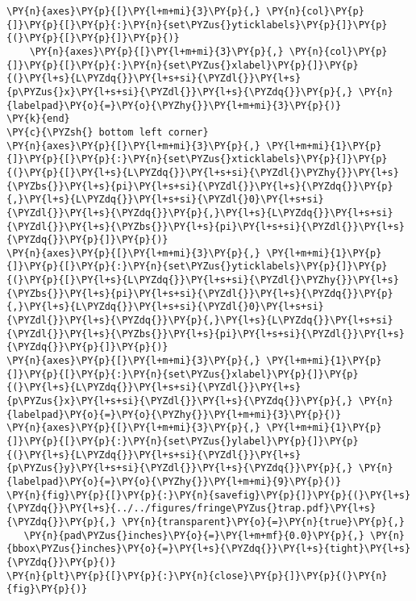 \begin{Verbatim}[commandchars=\\\{\}]
    \PY{n}{axes}\PY{p}{[}\PY{l+m+mi}{3}\PY{p}{,} \PY{n}{col}\PY{p}{]}\PY{p}{[}\PY{p}{:}\PY{n}{set\PYZus{}yticklabels}\PY{p}{]}\PY{p}{(}\PY{p}{[}\PY{p}{]}\PY{p}{)}
    \PY{n}{axes}\PY{p}{[}\PY{l+m+mi}{3}\PY{p}{,} \PY{n}{col}\PY{p}{]}\PY{p}{[}\PY{p}{:}\PY{n}{set\PYZus{}xlabel}\PY{p}{]}\PY{p}{(}\PY{l+s}{L\PYZdq{}}\PY{l+s+si}{\PYZdl{}}\PY{l+s}{p\PYZus{}x}\PY{l+s+si}{\PYZdl{}}\PY{l+s}{\PYZdq{}}\PY{p}{,} \PY{n}{labelpad}\PY{o}{=}\PY{o}{\PYZhy{}}\PY{l+m+mi}{3}\PY{p}{)}
\PY{k}{end}
\PY{c}{\PYZsh{} bottom left corner}
\PY{n}{axes}\PY{p}{[}\PY{l+m+mi}{3}\PY{p}{,} \PY{l+m+mi}{1}\PY{p}{]}\PY{p}{[}\PY{p}{:}\PY{n}{set\PYZus{}xticklabels}\PY{p}{]}\PY{p}{(}\PY{p}{[}\PY{l+s}{L\PYZdq{}}\PY{l+s+si}{\PYZdl{}\PYZhy{}}\PY{l+s}{\PYZbs{}}\PY{l+s}{pi}\PY{l+s+si}{\PYZdl{}}\PY{l+s}{\PYZdq{}}\PY{p}{,}\PY{l+s}{L\PYZdq{}}\PY{l+s+si}{\PYZdl{}0}\PY{l+s+si}{\PYZdl{}}\PY{l+s}{\PYZdq{}}\PY{p}{,}\PY{l+s}{L\PYZdq{}}\PY{l+s+si}{\PYZdl{}}\PY{l+s}{\PYZbs{}}\PY{l+s}{pi}\PY{l+s+si}{\PYZdl{}}\PY{l+s}{\PYZdq{}}\PY{p}{]}\PY{p}{)}
\PY{n}{axes}\PY{p}{[}\PY{l+m+mi}{3}\PY{p}{,} \PY{l+m+mi}{1}\PY{p}{]}\PY{p}{[}\PY{p}{:}\PY{n}{set\PYZus{}yticklabels}\PY{p}{]}\PY{p}{(}\PY{p}{[}\PY{l+s}{L\PYZdq{}}\PY{l+s+si}{\PYZdl{}\PYZhy{}}\PY{l+s}{\PYZbs{}}\PY{l+s}{pi}\PY{l+s+si}{\PYZdl{}}\PY{l+s}{\PYZdq{}}\PY{p}{,}\PY{l+s}{L\PYZdq{}}\PY{l+s+si}{\PYZdl{}0}\PY{l+s+si}{\PYZdl{}}\PY{l+s}{\PYZdq{}}\PY{p}{,}\PY{l+s}{L\PYZdq{}}\PY{l+s+si}{\PYZdl{}}\PY{l+s}{\PYZbs{}}\PY{l+s}{pi}\PY{l+s+si}{\PYZdl{}}\PY{l+s}{\PYZdq{}}\PY{p}{]}\PY{p}{)}
\PY{n}{axes}\PY{p}{[}\PY{l+m+mi}{3}\PY{p}{,} \PY{l+m+mi}{1}\PY{p}{]}\PY{p}{[}\PY{p}{:}\PY{n}{set\PYZus{}xlabel}\PY{p}{]}\PY{p}{(}\PY{l+s}{L\PYZdq{}}\PY{l+s+si}{\PYZdl{}}\PY{l+s}{p\PYZus{}x}\PY{l+s+si}{\PYZdl{}}\PY{l+s}{\PYZdq{}}\PY{p}{,} \PY{n}{labelpad}\PY{o}{=}\PY{o}{\PYZhy{}}\PY{l+m+mi}{3}\PY{p}{)}
\PY{n}{axes}\PY{p}{[}\PY{l+m+mi}{3}\PY{p}{,} \PY{l+m+mi}{1}\PY{p}{]}\PY{p}{[}\PY{p}{:}\PY{n}{set\PYZus{}ylabel}\PY{p}{]}\PY{p}{(}\PY{l+s}{L\PYZdq{}}\PY{l+s+si}{\PYZdl{}}\PY{l+s}{p\PYZus{}y}\PY{l+s+si}{\PYZdl{}}\PY{l+s}{\PYZdq{}}\PY{p}{,} \PY{n}{labelpad}\PY{o}{=}\PY{o}{\PYZhy{}}\PY{l+m+mi}{9}\PY{p}{)}
\PY{n}{fig}\PY{p}{[}\PY{p}{:}\PY{n}{savefig}\PY{p}{]}\PY{p}{(}\PY{l+s}{\PYZdq{}}\PY{l+s}{../../figures/fringe\PYZus{}trap.pdf}\PY{l+s}{\PYZdq{}}\PY{p}{,} \PY{n}{transparent}\PY{o}{=}\PY{n}{true}\PY{p}{,}
   \PY{n}{pad\PYZus{}inches}\PY{o}{=}\PY{l+m+mf}{0.0}\PY{p}{,} \PY{n}{bbox\PYZus{}inches}\PY{o}{=}\PY{l+s}{\PYZdq{}}\PY{l+s}{tight}\PY{l+s}{\PYZdq{}}\PY{p}{)}
\PY{n}{plt}\PY{p}{[}\PY{p}{:}\PY{n}{close}\PY{p}{]}\PY{p}{(}\PY{n}{fig}\PY{p}{)}
\end{Verbatim}

